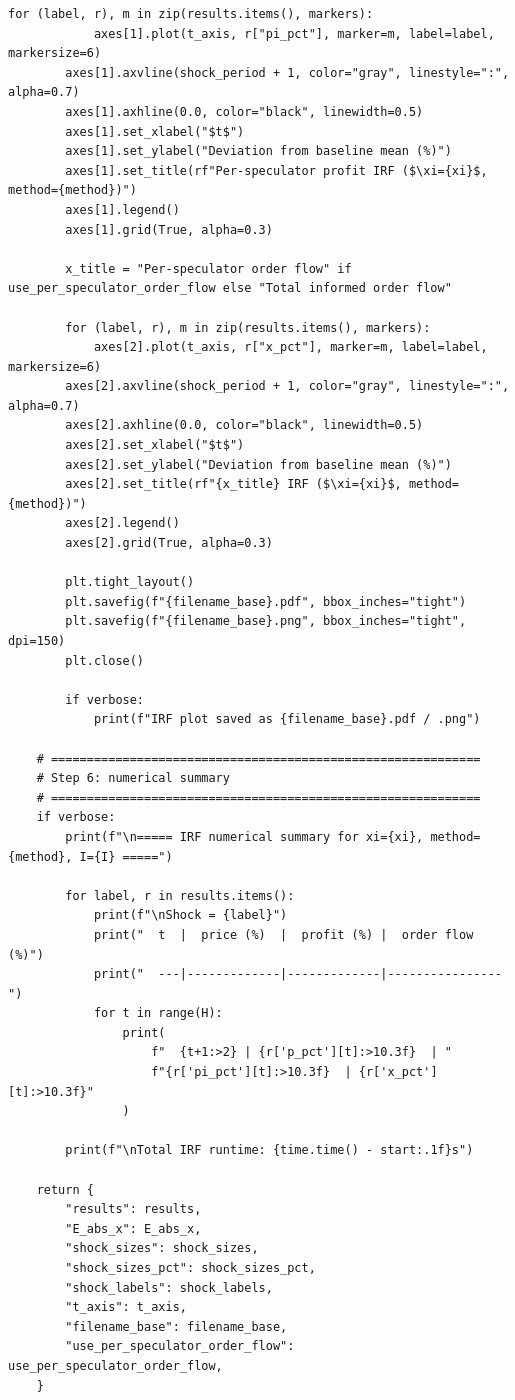 \begin{lstlisting}[style=pythonstyle]
        for (label, r), m in zip(results.items(), markers):
            axes[1].plot(t_axis, r["pi_pct"], marker=m, label=label, markersize=6)
        axes[1].axvline(shock_period + 1, color="gray", linestyle=":", alpha=0.7)
        axes[1].axhline(0.0, color="black", linewidth=0.5)
        axes[1].set_xlabel("$t$")
        axes[1].set_ylabel("Deviation from baseline mean (%)")
        axes[1].set_title(rf"Per-speculator profit IRF ($\xi={xi}$, method={method})")
        axes[1].legend()
        axes[1].grid(True, alpha=0.3)

        x_title = "Per-speculator order flow" if use_per_speculator_order_flow else "Total informed order flow"

        for (label, r), m in zip(results.items(), markers):
            axes[2].plot(t_axis, r["x_pct"], marker=m, label=label, markersize=6)
        axes[2].axvline(shock_period + 1, color="gray", linestyle=":", alpha=0.7)
        axes[2].axhline(0.0, color="black", linewidth=0.5)
        axes[2].set_xlabel("$t$")
        axes[2].set_ylabel("Deviation from baseline mean (%)")
        axes[2].set_title(rf"{x_title} IRF ($\xi={xi}$, method={method})")
        axes[2].legend()
        axes[2].grid(True, alpha=0.3)

        plt.tight_layout()
        plt.savefig(f"{filename_base}.pdf", bbox_inches="tight")
        plt.savefig(f"{filename_base}.png", bbox_inches="tight", dpi=150)
        plt.close()

        if verbose:
            print(f"IRF plot saved as {filename_base}.pdf / .png")

    # ============================================================
    # Step 6: numerical summary
    # ============================================================
    if verbose:
        print(f"\n===== IRF numerical summary for xi={xi}, method={method}, I={I} =====")

        for label, r in results.items():
            print(f"\nShock = {label}")
            print("  t  |  price (%)  |  profit (%) |  order flow (%)")
            print("  ---|-------------|-------------|----------------")
            for t in range(H):
                print(
                    f"  {t+1:>2} | {r['p_pct'][t]:>10.3f}  | "
                    f"{r['pi_pct'][t]:>10.3f}  | {r['x_pct'][t]:>10.3f}"
                )

        print(f"\nTotal IRF runtime: {time.time() - start:.1f}s")

    return {
        "results": results,
        "E_abs_x": E_abs_x,
        "shock_sizes": shock_sizes,
        "shock_sizes_pct": shock_sizes_pct,
        "shock_labels": shock_labels,
        "t_axis": t_axis,
        "filename_base": filename_base,
        "use_per_speculator_order_flow": use_per_speculator_order_flow,
    }
\end{lstlisting}

